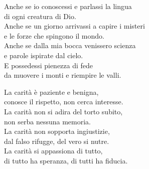 
\strofa Anche se io conoscessi e parlassi la lingua\\
di ogni creatura di Dio.\\
Anche se un giorno arrivassi a capire i misteri\\
e le forze che spingono il mondo.\\
Anche se dalla mia bocca venissero scienza\\
e parole ispirate dal cielo.\\
E possedessi pienezza di fede\\
da muovere i monti e riempire le valli.

\spazio


\spazio

\strofa La carità è paziente e benigna,\\
conosce il rispetto, non cerca interesse.\\
La carità non si adira del torto subito,\\
non serba nessuna memoria.\\
La carità non sopporta ingiustizie,\\
dal falso rifugge, del vero si nutre.\\
La carità si appassiona di tutto,\\
di tutto ha speranza, di tutti ha fiducia.

\spazio

